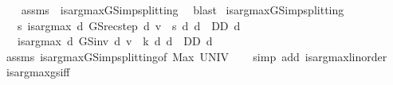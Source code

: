 \begin{isabellebody}
%
\isadelimproof
\ \ %
\endisadelimproof
%
\isatagproof
{}\isamarkupfalse%
\ assms\ \ is{\isacharunderscore}{\kern0pt}arg{\isacharunderscore}{\kern0pt}max{\isacharunderscore}{\kern0pt}GS{\isacharunderscore}{\kern0pt}imp{\isacharunderscore}{\kern0pt}splitting{\isacharprime}{\kern0pt}{\isacharprime}{\kern0pt}\ \isamarkupfalse%
\ blast%
\endisatagproof
{\isafoldproof}%
%
\isadelimproof
\isanewline
%
\endisadelimproof
\isanewline
{}\isamarkupfalse%
\ is{\isacharunderscore}{\kern0pt}arg{\isacharunderscore}{\kern0pt}max{\isacharunderscore}{\kern0pt}GS{\isacharunderscore}{\kern0pt}imp{\isacharunderscore}{\kern0pt}splitting{\isacharcolon}{\kern0pt}\isanewline
\ \ \ {\isachardoublequoteopen}{\isasymAnd}s{\isachardot}{\kern0pt}\ is{\isacharunderscore}{\kern0pt}arg{\isacharunderscore}{\kern0pt}max\ {\isacharparenleft}{\kern0pt}{\isasymlambda}d{\isachardot}{\kern0pt}\ GS{\isacharunderscore}{\kern0pt}rec{\isacharunderscore}{\kern0pt}step\ d\ v\ {\isachardollar}{\kern0pt}\ s{\isacharparenright}{\kern0pt}\ {\isacharparenleft}{\kern0pt}{\isasymlambda}d{\isachardot}{\kern0pt}\ d\ {\isasymin}\ D\isactrlsub D{\isacharparenright}{\kern0pt}\ d{\isachardoublequoteclose}\isanewline
\ \ \ {\isachardoublequoteopen}is{\isacharunderscore}{\kern0pt}arg{\isacharunderscore}{\kern0pt}max\ {\isacharparenleft}{\kern0pt}{\isasymlambda}d{\isachardot}{\kern0pt}\ GS{\isacharunderscore}{\kern0pt}inv\ d\ v\ {\isachardollar}{\kern0pt}\ k{\isacharparenright}{\kern0pt}\ {\isacharparenleft}{\kern0pt}{\isasymlambda}d{\isachardot}{\kern0pt}\ d\ {\isasymin}\ D\isactrlsub D{\isacharparenright}{\kern0pt}\ d{\isachardoublequoteclose}\isanewline
%
\isadelimproof
\ \ %
\endisadelimproof
%
\isatagproof
{}\isamarkupfalse%
\ assms\ is{\isacharunderscore}{\kern0pt}arg{\isacharunderscore}{\kern0pt}max{\isacharunderscore}{\kern0pt}GS{\isacharunderscore}{\kern0pt}imp{\isacharunderscore}{\kern0pt}splitting{\isacharprime}{\kern0pt}{\isacharbrackleft}{\kern0pt}of\ {\isachardoublequoteopen}Max\ UNIV{\isachardoublequoteclose}{\isacharbrackright}{\kern0pt}\isanewline
\ \ \isamarkupfalse%
\ {\isacharparenleft}{\kern0pt}simp\ add{\isacharcolon}{\kern0pt}\ is{\isacharunderscore}{\kern0pt}arg{\isacharunderscore}{\kern0pt}max{\isacharunderscore}{\kern0pt}linorder{\isacharparenright}{\kern0pt}%
\endisatagproof
{\isafoldproof}%
%
\isadelimproof
\isanewline
%
\endisadelimproof
\isanewline
{}\isamarkupfalse%
\ is{\isacharunderscore}{\kern0pt}arg{\isacharunderscore}{\kern0pt}max{\isacharunderscore}{\kern0pt}gs{\isacharunderscore}{\kern0pt}iff{\isacharcolon}{\kern0pt}\isanewline

\end{isabellebody}
